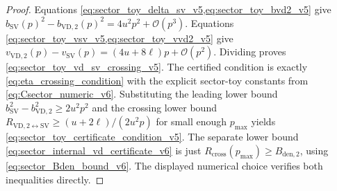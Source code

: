 \documentclass[11pt]{article}
\newcommand{\1}{\mathbf{1}}
\newcommand{\OO}{\mathcal{O}}
\begin{document}
\begin{proof}
Equations \cref{eq:sector_toy_delta_sv_v5,eq:sector_toy_bvd2_v5} give
\(b_{\mathrm{SV}}(p)^2-b_{\mathrm{VD},2}(p)^2=4u^2p^2+\OO(p^3)\).  Equations \cref{eq:sector_toy_vsv_v5,eq:sector_toy_vvd2_v5} give
\(v_{\mathrm{VD},2}(p)-v_{\mathrm{SV}}(p)=(4u+8\ell)p+\OO(p^2)\).  Dividing proves \cref{eq:sector_toy_vd_sv_crossing_v5}.  The certified condition is exactly \cref{eq:eta_crossing_condition} with the explicit sector-toy constants from \cref{eq:Csector_numeric_v6}.  Substituting the leading lower bound \(b_{\mathrm{SV}}^2-b_{\mathrm{VD},2}^2\ge 2u^2p^2\) and the crossing lower bound \(R_{\mathrm{VD},2\leftrightarrow\mathrm{SV}}\ge (u+2\ell)/(2u^2p)\) for small enough \(p_{\max}\) yields \cref{eq:sector_toy_certificate_condition_v5}.  The separate lower bound \cref{eq:sector_internal_vd_certificate_v6} is just \(R_{\mathrm{cross}}(p_{\max})\ge B_{\mathrm{den},2}\), using \cref{eq:sector_Bden_bound_v6}.  The displayed numerical choice verifies both inequalities directly.
\end{proof}
\end{document}
